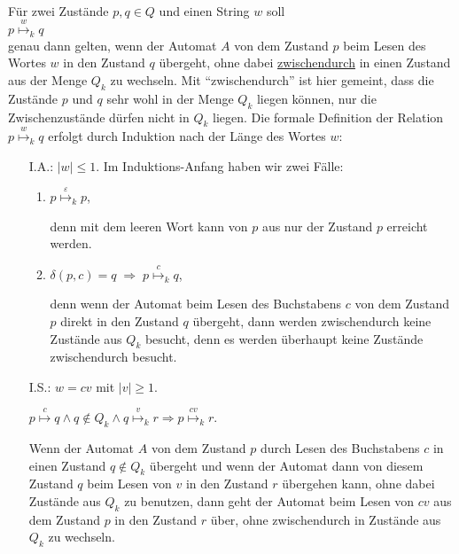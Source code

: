 \\[0.2cm]
F\"ur zwei Zust\"ande $p, q \in Q$ und einen String $w$ soll 
\\[0.2cm]
\hspace*{1.3cm}
$p \stackrel{w}{\mapsto}_k q$
\\[0.2cm]
genau dann gelten, wenn der Automat $A$ von dem Zustand $p$ beim Lesen des Wortes $w$ in
den Zustand $q$ \"ubergeht, ohne dabei \underline{zwischendurch} in einen Zustand aus der
Menge $Q_k$ zu wechseln.  Mit ``zwischendurch'' ist hier gemeint, dass die Zust\"ande $p$
und $q$ sehr wohl in der Menge $Q_k$ liegen k\"onnen, nur die Zwischenzust\"ande d\"urfen nicht in $Q_k$
liegen.  Die formale Definition der Relation  
$p \stackrel{w}{\mapsto}_k q$ erfolgt durch Induktion nach der L\"ange des Wortes $w$:
\begin{enumerate}
\item[I.A.:] $|w| \leq 1$.  Im Induktions-Anfang haben wir zwei F\"alle:
  \begin{enumerate}
  \item $p \stackrel{\varepsilon}{\mapsto}_k p$,

        denn mit dem leeren Wort kann von $p$ aus nur der Zustand $p$ erreicht
        werden.
  \item $\delta(p, c) = q \;\Rightarrow\; p \stackrel{c}{\mapsto}_k q$,

        denn wenn der Automat beim Lesen des Buchstabens $c$ von dem Zustand $p$ direkt
        in den Zustand $q$ \"ubergeht, dann werden zwischendurch keine Zust\"ande aus $Q_k$
        besucht, denn es werden \"uberhaupt keine Zust\"ande zwischendurch besucht.
  \end{enumerate}
\item[I.S.:] $w = cv$ mit $|v| \geq 1$.

             \hspace*{1.3cm}
            $p \stackrel{c}{\mapsto} q \wedge q \not\in Q_k \wedge q \stackrel{v}{\mapsto}_k r
              \Rightarrow p \stackrel{cv}{\mapsto}_k r$.

             Wenn der Automat $A$ von dem Zustand $p$ durch Lesen des Buchstabens $c$
             in einen  Zustand $q \notin Q_k$ \"ubergeht und wenn der Automat dann von
             diesem Zustand $q$ beim Lesen von $v$ in den Zustand $r$ \"ubergehen kann, ohne
             dabei Zust\"ande aus $Q_k$ zu benutzen, dann geht der Automat beim Lesen von
             $cv$ aus dem Zustand $p$ in den Zustand $r$ \"uber,
             ohne zwischendurch in Zust\"ande aus $Q_k$ zu wechseln.
\end{enumerate}
